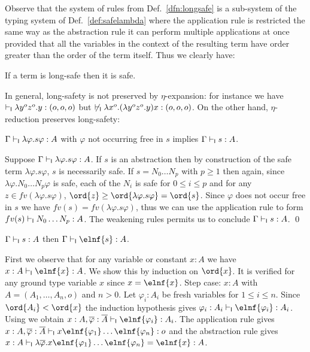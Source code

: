 Observe that the system of rules from Def.~\ref{dfn:longsafe} is a sub-system of the typing system of Def.~\ref{def:safelambda} where the application rule is  restricted the same way as the abstraction rule \ie it can perform multiple applications at once provided that all the variables in the context of the resulting term have order greater than the order of the term itself. Thus we clearly have:
\begin{lemma}
\label{lem:longsafe_imp_safe}
If a term is long-safe then it is safe.
\end{lemma}
\smallskip

In general, long-safety is not preserved by $\eta$-expansion: for
instance we have
$\vdash_{\sf l} \lambda y^o z^o . y : (o,o,o)$ but
$\not \vdash_{\sf l}\lambda x^o . (\lambda y^o z^o . y) x : (o,o,o)$.
On the other hand,  $\eta$-reduction preserves long-safety:

\begin{lemma}
\label{lem:etared_preserve_longsafety}
  $\Gamma \vdash_{\sf l} \lambda \varphi . s \varphi :A $ with $\varphi$ not
  occurring free in $s$ implies $\Gamma \vdash_{\sf l} s :A$.
\end{lemma}
\proof
  Suppose $\Gamma \vdash_{\sf l} \lambda \varphi . s \varphi :A$. If $s$ is an  abstraction then by construction of the safe term $\lambda \varphi . s \varphi$, $s$ is necessarily safe.  If $s = N_0 \ldots N_p$ with
  $p\geq 1$ then again, since $\lambda \varphi . N_0 \ldots N_p
  \varphi$ is safe, each of the $N_i$ is safe for $0 \leq i \leq p$
  and for any $z\in fv(\lambda \varphi . s \varphi)$, $\ord{z} \geq
  \ord{\lambda \varphi . s \varphi} = \ord{s}$. Since  $\varphi$ does not occur free in $s$ we have $fv(s) = fv(\lambda \varphi . s \varphi)$, thus we can use the application rule to form $fv(s) \vdash_{\sf l} N_0 \ldots N_p : A$. The weakening rules permits us to conclude $\Gamma \vdash_{\sf l} s :A$. \qed
\smallskip

\begin{lemma}
\label{lem:longsafe_imp_elnf_longsafe}
$\Gamma \vdash_{\sf l} s :A$ then $\Gamma \lsentail \elnf{s} :A$.
\end{lemma}
\proof
 First we observe that for any variable or constant $x:A$ we have $x:A \lsentail \elnf{x} :A$. We show this by induction on $\ord{x}$.
It is verified for any ground type variable $x$
since $x = \elnf{x}$.
Step case: $x:A$ with $A=(A_1, \ldots, A_n,o)$ and $n>0$. Let $\varphi_i:A_i$ be fresh variables for $1\leq i\leq n$.
Since $\ord{A_i} < \ord{x}$ the induction hypothesis gives $\varphi_i :A_i \lsentail \elnf{\varphi_i} : A_i$. Using  we obtain $x:A, \overline{\varphi} : \overline{A}
  \lsentail \elnf{\varphi_i} :A_i$.  The application rule gives $x :A, \overline{\varphi} : \overline{A} \lsentail x \elnf{\varphi_1} \ldots \elnf{\varphi_n}
  : o$ and the abstraction rule gives $ x :A \lsentail \lambda
  \overline{\varphi} . x \elnf{\varphi_1} \ldots \elnf{\varphi_n} =
  \elnf{x} :A$.



